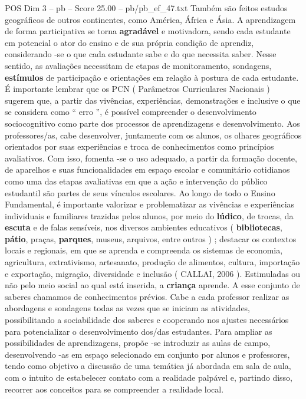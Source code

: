\begin{textsample}{POS Dim 3 – pb – Score 25.00 – pb/pb\_ef\_47.txt}
Também são feitos estudos geográficos de outros continentes, como América, África e Ásia.
A aprendizagem de forma participativa se torna \textbf{agradável} e motivadora, sendo cada estudante em potencial o ator do ensino e de sua própria condição de aprendiz, considerando -se o que cada estudante sabe e do que necessita saber.
Nesse sentido, as avaliações necessitam de etapas de monitoramento, sondagens, \textbf{estímulos} de participação e orientações em relação à postura de cada estudante.
É importante lembrar que os PCN ( Parâmetros Curriculares Nacionais ) sugerem que, a partir das vivências, experiências, demonstrações e inclusive o que se considera como “ erro ”, é possível compreender o desenvolvimento sociocognitivo como parte dos processos de aprendizagens e desenvolvimento.
Aos professores/as, cabe desenvolver, juntamente com os alunos, os olhares geográficos orientados por suas experiências e troca de conhecimentos como princípios avaliativos.
Com isso, fomenta -se o uso adequado, a partir da formação docente, de aparelhos e suas funcionalidades em espaço escolar e comunitário cotidianos como uma das etapas avaliativas em que a ação e intervenção do público estudantil são partes de seus vínculos escolares.
Ao longo de todo o Ensino Fundamental, é importante valorizar e problematizar as vivências e experiências individuais e familiares trazidas pelos alunos, por meio do \textbf{lúdico}, de trocas, da \textbf{escuta} e de falas sensíveis, nos diversos ambientes educativos ( \textbf{bibliotecas}, \textbf{pátio}, praças, \textbf{parques}, museus, arquivos, entre outros ) ; destacar os contextos locais e regionais, em que se aprenda e compreenda os sistemas de economia, agricultura, extrativismo, artesanato, produção de alimentos, cultura, importação e exportação, migração, diversidade e inclusão ( CALLAI, 2006 ).
Estimuladas ou não pelo meio social ao qual está inserida, a \textbf{criança} aprende.
A esse conjunto de saberes chamamos de conhecimentos prévios.
Cabe a cada professor realizar as abordagens e sondagens todas as vezes que se iniciam as atividades, possibilitando a sociabilidade dos saberes e cooperando nos ajustes necessários para potencializar o desenvolvimento dos/das estudantes.
Para ampliar as possibilidades de aprendizagens, propõe -se introduzir as aulas de campo, desenvolvendo -as em espaço selecionado em conjunto por alunos e professores, tendo como objetivo a discussão de uma temática já abordada em sala de aula, com o intuito de estabelecer contato com a realidade palpável e, partindo disso, recorrer aos conceitos para se compreender a realidade local.

\end{textsample}
